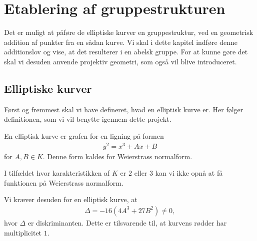\chapter{Etablering af gruppestrukturen}
Det er muligt at påføre de elliptiske kurver en gruppestruktur, ved en
geometrisk addition af punkter fra en sådan kurve. Vi skal i dette kapitel indføre 
denne additionslov og vise, at det resulterer i en abelsk gruppe. For at kunne
gøre det skal vi desuden anvende projektiv geometri, som også vil blive 
introduceret.


\section{Elliptiske kurver}
Først og fremmest skal vi have defineret, hvad en elliptisk kurve er. Her 
følger definitionen, som vi vil benytte igennem dette projekt.

\begin{definition}
En elliptisk kurve er grafen for en ligning på formen
\begin{align}
	\label{elliptic}
	y^2 = x^3 + Ax + B
\end{align}
for $A, B \in K$. Denne form kaldes for Weierstrass normalform.
\end{definition}

\begin{remark}
I tilfældet hvor karakteristikken af $K$ er $2$ eller $3$ kan vi
ikke opnå at få funktionen på Weierstrass normalform.
\end{remark}

Vi kræver desuden for en elliptisk kurve, at 
\begin{align*}
	\Delta = -16(4A^3 + 27B^2) \neq 0,
\end{align*}
hvor $\Delta$ er diskriminanten. Dette er tilsvarende til, at kurvens
rødder har multiplicitet $1$.


